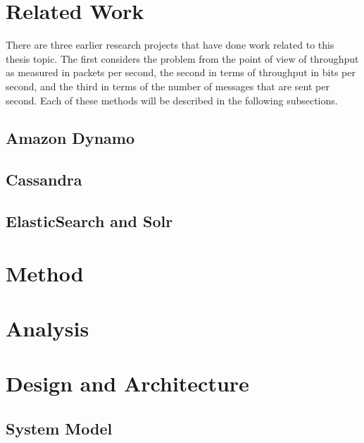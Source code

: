 \documentclass[12pt,a4paper,twoside,openright]{book}
\begin{document}
\chapter{Related Work}
\label{sec:related_work}

There are three earlier research projects that have done work related to this
thesis topic. The first considers the problem from the point of view of
throughput as measured in packets per second, the second in terms of
throughput in bits per second, and the third in terms of the number of
messages that are sent per second. Each of these methods will be described in
the following subsections.

\section{Amazon Dynamo}

\section{Cassandra}

\section{ElasticSearch and Solr}

\chapter{Method}
\label{chap:method}


\chapter{Analysis}
\label{chap:analysis}




\chapter{Design and Architecture}
\label{sec:design}

\section{System Model}
\end{document}
